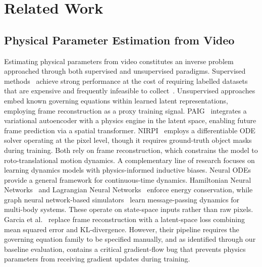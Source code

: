 \documentclass[runningheads]{llncs}
\begin{document}
\section{Related Work}
\label{sec:related}

\subsection{Physical Parameter Estimation from Video}
\label{sec:related_phys_estimation}

Estimating physical parameters from video constitutes an inverse problem approached through both supervised and unsupervised paradigms. Supervised methods~\cite{asenov2019vid2param, de2018end, watters2017visual, wu2015galileo, wu2017learning, yang2022learning, zheng2018unsupervised} achieve strong performance at the cost of requiring labelled datasets that are expensive and frequently infeasible to collect~\cite{toth2019hamiltonian}. Unsupervised approaches embed known governing equations within learned latent representations, employing frame reconstruction as a proxy training signal. PAIG~\cite{jaques2019physics} integrates a variational autoencoder with a physics engine in the latent space, enabling future frame prediction via a spatial transformer. NIRPI~\cite{hofherr2023neural} employs a differentiable ODE solver operating at the pixel level, though it requires ground-truth object masks during training. Both rely on frame reconstruction, which constrains the model to roto-translational motion dynamics. A complementary line of research focuses on learning dynamics models with physics-informed inductive biases. Neural ODEs~\cite{chen2018neural} provide a general framework for continuous-time dynamics. Hamiltonian Neural Networks~\cite{greydanus2019hamiltonian} and Lagrangian Neural Networks~\cite{cranmer2020lagrangian} enforce energy conservation, while graph neural network-based simulators~\cite{sanchez2020learning, battaglia2016interaction} learn message-passing dynamics for multi-body systems. These operate on state-space inputs rather than raw pixels. Garcia et al.~\cite{garcia2025learning} replace frame reconstruction with a latent-space loss combining mean squared error and KL-divergence. However, their pipeline requires the governing equation family to be specified manually, and as identified through our baseline evaluation, contains a critical gradient-flow bug that prevents physics parameters from receiving gradient updates during training.
\end{document}
